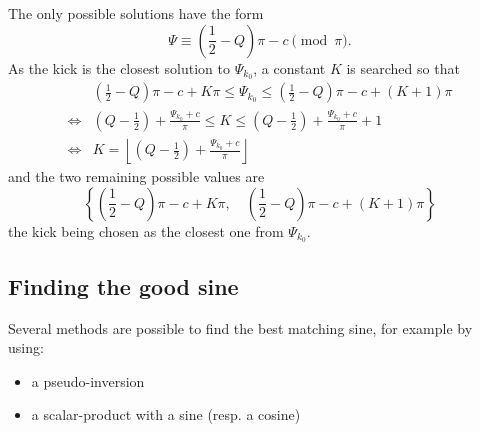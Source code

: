 The only possible solutions have the form
\begin{equation}
 \Psi \equiv \left(\frac{1}{2} - Q\right) \pi - c \pmod \pi.
\end{equation}
As the kick is the closest solution to $\Psi_{k_0}$, a constant $K$ is searched so that
\begin{align}
&\left(\frac{1}{2} - Q\right) \pi - c + K \pi  \leq \Psi_{k_0} \leq \left(\frac{1}{2} - Q\right) \pi - c + (K+1) \pi \\
\iff  &\left(Q - \frac{1}{2}\right) + \frac{\Psi_{k_0} + c}{\pi}\leq K \leq \left(Q - \frac{1}{2}\right) + \frac{\Psi_{k_0} + c}{\pi} +1 \\
\iff & K = \left\lfloor \left(Q - \frac{1}{2}\right) + \frac{\Psi_{k_0}+c}{\pi} \right\rfloor
\end{align}
and the two remaining possible values are
\begin{equation}
\left\lbrace \left(\frac{1}{2} - Q\right) \pi - c + K \pi , \quad \left(\frac{1}{2} - Q\right) \pi - c + (K+1) \pi\right\rbrace
\end{equation}
the kick being chosen as the closest one from $\Psi_{k_0}$.

\subsection{Finding the good sine}
Several methods are possible to find the best matching sine, for example by using:
\begin{itemize}
	\item a pseudo-inversion
	\item a scalar-product with a sine (resp. a cosine)
\end{itemize}

